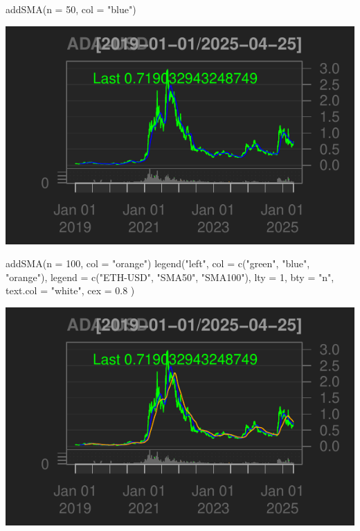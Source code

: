 \documentclass[]{tufte-handout}
\newenvironment{Shaded}{}{}
\newcommand{\AttributeTok}[1]{\textcolor[rgb]{0.49,0.56,0.16}{#1}}
\newcommand{\DecValTok}[1]{\textcolor[rgb]{0.25,0.63,0.44}{#1}}
\newcommand{\FloatTok}[1]{\textcolor[rgb]{0.25,0.63,0.44}{#1}}
\newcommand{\FunctionTok}[1]{\textcolor[rgb]{0.02,0.16,0.49}{#1}}
\newcommand{\NormalTok}[1]{#1}
\newcommand{\StringTok}[1]{\textcolor[rgb]{0.25,0.44,0.63}{#1}}
\begin{document}
\begin{Shaded}
\begin{Highlighting}[]
\FunctionTok{addSMA}\NormalTok{(}\AttributeTok{n =} \DecValTok{50}\NormalTok{, }\AttributeTok{col =} \StringTok{"blue"}\NormalTok{)}
\end{Highlighting}
\end{Shaded}

\includegraphics{cripto_update_files/figure-latex/unnamed-chunk-7-2}

\begin{Shaded}
\begin{Highlighting}[]
\FunctionTok{addSMA}\NormalTok{(}\AttributeTok{n =} \DecValTok{100}\NormalTok{, }\AttributeTok{col =} \StringTok{"orange"}\NormalTok{)}
\FunctionTok{legend}\NormalTok{(}\StringTok{"left"}\NormalTok{,}
  \AttributeTok{col =} \FunctionTok{c}\NormalTok{(}\StringTok{"green"}\NormalTok{, }\StringTok{"blue"}\NormalTok{, }\StringTok{"orange"}\NormalTok{),}
  \AttributeTok{legend =} \FunctionTok{c}\NormalTok{(}\StringTok{"ETH{-}USD"}\NormalTok{, }\StringTok{"SMA50"}\NormalTok{, }\StringTok{"SMA100"}\NormalTok{), }\AttributeTok{lty =} \DecValTok{1}\NormalTok{, }\AttributeTok{bty =} \StringTok{"n"}\NormalTok{,}
  \AttributeTok{text.col =} \StringTok{"white"}\NormalTok{, }\AttributeTok{cex =} \FloatTok{0.8}
\NormalTok{)}
\end{Highlighting}
\end{Shaded}

\includegraphics{cripto_update_files/figure-latex/unnamed-chunk-7-3}
\end{document}
